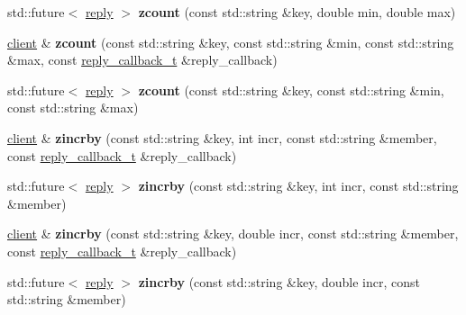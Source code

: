 \begin{DoxyCompactItemize}
std\+::future$<$ \mbox{\hyperlink{classcpp__redis_1_1reply}{reply}} $>$ {\bfseries zcount} (const std\+::string \&key, double min, double max)
\item 
\mbox{\label{classcpp__redis_1_1client_a4638b70036c17ddd87dc204392ea7718}} 
\mbox{\hyperlink{classcpp__redis_1_1client}{client}} \& {\bfseries zcount} (const std\+::string \&key, const std\+::string \&min, const std\+::string \&max, const \mbox{\hyperlink{classcpp__redis_1_1client_af7a65eb21aa25230bfbb0b0203c4fc04}{reply\+\_\+callback\+\_\+t}} \&reply\+\_\+callback)
\item 
\mbox{\label{classcpp__redis_1_1client_a94416b729f3ecd32d41450725e773590}} 
std\+::future$<$ \mbox{\hyperlink{classcpp__redis_1_1reply}{reply}} $>$ {\bfseries zcount} (const std\+::string \&key, const std\+::string \&min, const std\+::string \&max)
\item 
\mbox{\label{classcpp__redis_1_1client_a7852309fc3054c1bce760e4e2189205b}} 
\mbox{\hyperlink{classcpp__redis_1_1client}{client}} \& {\bfseries zincrby} (const std\+::string \&key, int incr, const std\+::string \&member, const \mbox{\hyperlink{classcpp__redis_1_1client_af7a65eb21aa25230bfbb0b0203c4fc04}{reply\+\_\+callback\+\_\+t}} \&reply\+\_\+callback)
\item 
\mbox{\label{classcpp__redis_1_1client_ada07e0534d23fd0247cdc1b9a8008fe9}} 
std\+::future$<$ \mbox{\hyperlink{classcpp__redis_1_1reply}{reply}} $>$ {\bfseries zincrby} (const std\+::string \&key, int incr, const std\+::string \&member)
\item 
\mbox{\label{classcpp__redis_1_1client_abeb105281afc762ed57afce5619ef73f}} 
\mbox{\hyperlink{classcpp__redis_1_1client}{client}} \& {\bfseries zincrby} (const std\+::string \&key, double incr, const std\+::string \&member, const \mbox{\hyperlink{classcpp__redis_1_1client_af7a65eb21aa25230bfbb0b0203c4fc04}{reply\+\_\+callback\+\_\+t}} \&reply\+\_\+callback)
\item 
\mbox{\label{classcpp__redis_1_1client_a59164f47b17261f1a82cef5da072aa4c}} 
std\+::future$<$ \mbox{\hyperlink{classcpp__redis_1_1reply}{reply}} $>$ {\bfseries zincrby} (const std\+::string \&key, double incr, const std\+::string \&member)

\end{DoxyCompactItemize}
